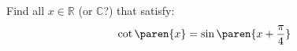 Find all $x \in \mathbb{R}$ (or $\mathbb{C}$?) that satisfy:
\begin{equation*}
  \cot\paren{x} = \sin\paren{x + \frac{\pi}{4}}
\end{equation*}
